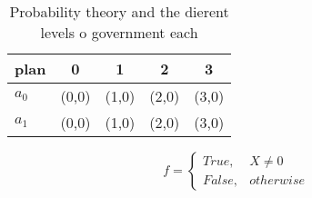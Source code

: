 \documentclass[a4paper]{article}
\begin{document}
\begin{table}
\begin{adjustbox}{width=0.5\columnwidth}
\begin{tabular}{|l|l|l|l|l|}
\hline
\textbf{plan} & \multicolumn{1}{c|}{\textbf{0}} & \multicolumn{1}{c|}{\textbf{1}} & \multicolumn{1}{c|}{\textbf{2}} & \multicolumn{1}{c|}{\textbf{3}} \\ \hline
\textbf{$a_0$}  & (0,0) & (1,0) & (2,0) & (3,0) \\ \hline
\textbf{$a_1$}  & (0,0) & (1,0) & (2,0) & (3,0) \\ \hline
\end{tabular}
\end{adjustbox}
\caption{Probability theory and the dierent levels o government each
}
\end{table}

\begin{equation}   f =
\begin{cases} True, & X \neq 0\\
False, & otherwise
\end{cases}
\end{equation}
\end{document}
